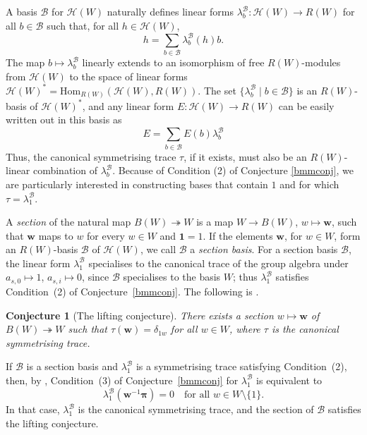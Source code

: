 \documentclass[11pt, reqno]{amsart}
\newcommand{\cB}{\mathcal{B}}
\newcommand{\cH}{\mathcal{H}}
\newcommand{\Hom}{\mathrm{Hom}}
\numberwithin{equation}{section}
\newtheorem{conjecture}[theorem]{Conjecture}
\theoremstyle{remark}
\begin{document}
	A basis $\cB$ for $\cH(W)$ naturally defines linear forms $\lambda^{\cB}_b:\cH(W)\rightarrow R(W)$ for all $b \in \cB$ such that,  for all $h\in \cH(W)$,
	$$h=\sum_{b\in \cB}\lambda^{\cB}_b(h) b.$$	
	The map $b\mapsto \lambda_b^{\cB}$ linearly extends to an isomorphism of free $R(W)$-modules from $\cH(W)$ to the space of linear forms $\cH(W)^{*}=\Hom_{R(W)}(\cH(W),R(W))$. The set $\{\lambda_b^\cB\mid b\in \cB\}$ is an $R(W)$-basis of $\cH(W)^{*}$, and any linear form $E:\cH(W)\rightarrow R(W)$ can be easily written out in this basis as
	$$E=\sum_{b\in \cB} E(b)\lambda^{\cB}_b$$ 
	Thus, the canonical symmetrising trace 
	$\tau$, if it exists, must also be an $R(W)$-linear combination of $\lambda^{\cB}_b$.
	Because of Condition (2) of Conjecture \ref{bmmconj}, we are particularly interested in constructing bases that contain $1$ and for which $\tau=\lambda^{\cB}_1$. 
	
	
	A \emph{section} of the natural map $B(W)\twoheadrightarrow W$ is a map
$W\to B(W)$, $w\mapsto\mathbf w$, such that $\mathbf w$ maps to $w$ for
every $w\in W$ and $\mathbf 1=1$. If the elements $\mathbf w$, for
$w\in W$, form an $R(W)$-basis $\mathcal B$ of $\mathcal H(W)$, we call
$\mathcal B$ a \emph{section basis}. For a section basis $\mathcal B$,
the linear form $\lambda^{\mathcal B}_1$ specialises to the canonical
trace of the group algebra under $a_{s,0}\mapsto1$, $a_{s,i}\mapsto0$,
since $\mathcal B$ specialises to the basis $W$; thus
$\lambda^{\mathcal B}_1$ satisfies Condition~(2) of
Conjecture~\ref{bmmconj}. The following is
\cite[Conjecture~2.6]{MM10}.

\begin{conjecture}[The lifting conjecture]
There exists a section $w\mapsto\mathbf w$ of
$B(W)\twoheadrightarrow W$ such that $\tau(\mathbf w)=\delta_{1w}$ for
all $w\in W$, where $\tau$ is the canonical symmetrising trace.
\end{conjecture}

If $\mathcal B$ is a section basis and $\lambda^{\mathcal B}_1$ is a
symmetrising trace satisfying Condition~(2), then, by
\cite[Proposition~2.7]{MM10}, Condition~(3) of
Conjecture~\ref{bmmconj} for $\lambda^{\mathcal B}_1$ is equivalent to
\begin{equation}\label{extra con2}
\lambda^{\mathcal B}_1(\mathbf w^{-1}\boldsymbol\pi)=0
\quad\text{for all } w\in W\setminus\{1\}.
\end{equation}
In that case, $\lambda^{\mathcal B}_1$ is the canonical symmetrising
trace, and the section of $\mathcal B$ satisfies the lifting conjecture.
\end{document}
